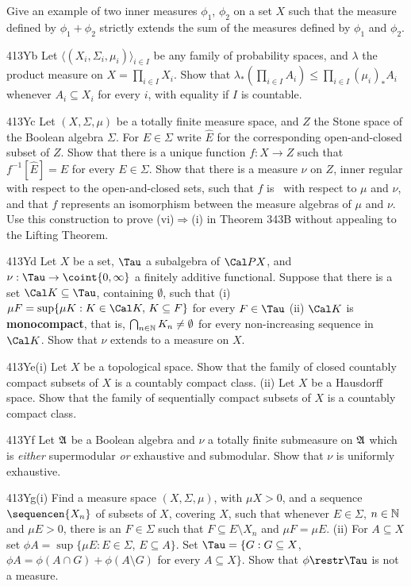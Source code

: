 {
Give an example of two inner measures $\phi_1$, $\phi_2$ on a set $X$
such that the measure defined by $\phi_1+\phi_2$ strictly extends the
sum of the measures defined by $\phi_1$ and $\phi_2$.

\spheader 413Yb Let $\langle(X_i,\Sigma_i,\mu_i)\rangle_{i\in I}$ be any
family of probability spaces, and $\lambda$ the product measure on
$X=\prod_{i\in I}X_i$.   Show that
$\lambda_*(\prod_{i\in I}A_i)\le\prod_{i\in I}(\mu_i)_*A_i$ whenever
$A_i\subseteq X_i$ for every $i$, with equality if $I$ is countable.

\spheader 413Yc Let $(X,\Sigma,\mu)$ be a totally finite measure space,
and $Z$ the Stone space of the Boolean algebra $\Sigma$.   For
$E\in\Sigma$ write $\widehat{E}$ for the corresponding open-and-closed
subset of $Z$.   Show that there is a unique function $f:X\to Z$ such
that $f^{-1}[\widehat{E}]=E$ for every $E\in\Sigma$.   Show that there
is a measure $\nu$ on $Z$, inner regular with respect to the
open-and-closed sets,
such that $f$ is \imp\ with respect to $\mu$ and $\nu$, and that $f$
represents an isomorphism between the measure algebras of $\mu$ and
$\nu$.   Use this construction to prove (vi)$\Rightarrow$(i) in Theorem
343B without appealing to the Lifting Theorem.

\spheader 413Yd Let $X$ be a set, $\Tau$ a subalgebra of $\Cal PX$, and
$\nu:\Tau\to\coint{0,\infty}$ a finitely additive functional.   Suppose
that there is a set $\Cal K\subseteq\Tau$, containing $\emptyset$, such
that (i) $\mu F=\sup\{\mu K:K\in\Cal K,\,K\subseteq F\}$ for every
$F\in\Tau$ (ii) $\Cal K$ is {\bf monocompact}, that is,
$\bigcap_{n\in\Bbb N}K_n\ne\emptyset$ for every non-increasing sequence
in $\Cal K$.   Show that $\nu$ extends to a measure on $X$.

\spheader 413Ye(i) Let $X$ be a topological space.   Show that the
family of closed countably compact subsets of $X$ is a countably compact
class.   (ii) Let $X$ be a Hausdorff space.   Show that the family of
sequentially compact subsets of $X$ is a countably compact class.

\spheader 413Yf
Let $\frak A$ be a Boolean algebra and $\nu$ a totally finite
submeasure on $\frak A$ which is {\it either} supermodular
{\it or} exhaustive and submodular.
Show that $\nu$ is uniformly exhaustive.

\spheader 413Yg(i)
Find a measure space $(X,\Sigma,\mu)$, with $\mu X>0$,
and a sequence
$\sequencen{X_n}$ of subsets of $X$, covering $X$, such that
whenever $E\in\Sigma$, $n\in\Bbb N$ and $\mu E>0$, there is an $F\in\Sigma$
such that $F\subseteq E\setminus X_n$ and $\mu F=\mu E$.
(ii) For $A\subseteq X$ set
$\phi A=\sup\{\mu E:E\in\Sigma$, $E\subseteq A\}$.   Set
$\Tau=\{G:G\subseteq X$, $\phi A=\phi(A\cap G)+\phi(A\setminus G)$ for
every $A\subseteq X\}$.   Show that $\phi\restr\Tau$ is not a measure.

}
